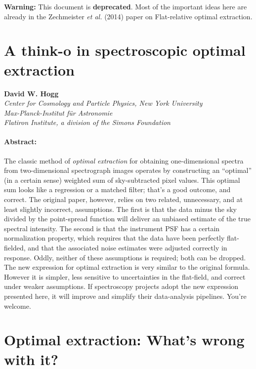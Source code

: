 \documentclass[12pt, letterpaper]{article}
\begin{document}
\sloppy\sloppypar\raggedbottom\frenchspacing

\noindent
\textbf{Warning:}
This document is \textbf{deprecated}.
Most of the important ideas here are already in the Zechmeister \textsl{et al.}
(2014) paper on Flat-relative optimal extraction.

\section*{A think-o in spectroscopic optimal extraction}

\noindent
\textbf{David W. Hogg}\\
{\footnotesize
\textsl{Center for Cosmology and Particle Physics, New York University}\\
\textsl{Max-Planck-Institut f\"ur Astronomie}\\
\textsl{Flatiron Institute, a division of the Simons Foundation}
}

\paragraph{Abstract:}
The classic method of \emph{optimal extraction} for obtaining
one-dimensional spectra from two-dimensional spectrograph images
operates by constructing an ``optimal'' (in a certain sense) weighted
sum of sky-subtracted pixel values.
This optimal sum looks like a regression or a matched filter;
that's a good outcome, and correct.
The original paper, however, relies on two related, unnecessary, and
at least slightly incorrect, assumptions.
The first is that the data minus the sky divided by the point-spread
function will deliver an unbiased estimate of the true spectral
intensity.
The second is that the instrument PSF has a certain normalization
property, which requires that the data have been perfectly
flat-fielded, and that the associated noise estimates were adjusted
correctly in response.
Oddly, neither of these assumptions is required; both can be dropped.
The new expression for optimal extraction is very similar to the
original formula.
However it is simpler, less sensitive to uncertainties in the
flat-field, and correct under weaker assumptions.
If spectroscopy projects adopt the new expression presented here, it
will improve and simplify their data-analysis pipelines.
You're welcome.

\section{Optimal extraction: What's wrong with it?}
\end{document}
